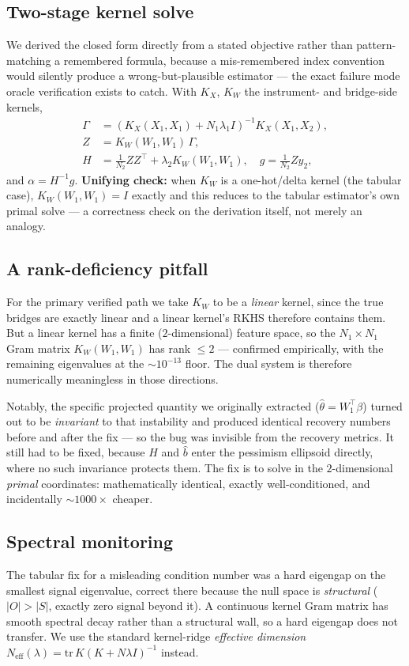 \subsection{Two-stage kernel solve}
We derived the closed form directly from a stated objective rather than
pattern-matching a remembered formula, because a mis-remembered index convention
would silently produce a wrong-but-plausible estimator --- the exact failure mode
oracle verification exists to catch. With $K_X$, $K_W$ the instrument- and
bridge-side kernels,
\begin{align}
\Gamma &= \left(K_X(X_1,X_1) + N_1\lambda_1 I\right)^{-1} K_X(X_1,X_2), \\
Z &= K_W(W_1,W_1)\,\Gamma, \\
H &= \tfrac{1}{N_2} Z Z^\top + \lambda_2 K_W(W_1,W_1), \quad
g = \tfrac{1}{N_2} Z y_2,
\end{align}
and $\alpha = H^{-1} g$. \textbf{Unifying check:} when $K_W$ is a one-hot/delta
kernel (the tabular case), $K_W(W_1,W_1) = I$ exactly and this reduces to the
tabular estimator's own primal solve --- a correctness check on the derivation
itself, not merely an analogy.

\subsection{A rank-deficiency pitfall}
For the primary verified path we take $K_W$ to be a \emph{linear} kernel, since
the true bridges are exactly linear and a linear kernel's RKHS therefore contains
them. But a linear kernel has a finite ($2$-dimensional) feature space, so the
$N_1 \times N_1$ Gram matrix $K_W(W_1,W_1)$ has rank $\le 2$ --- confirmed
empirically, with the remaining eigenvalues at the $\sim\!10^{-13}$ floor. The
dual system is therefore numerically meaningless in those directions.

Notably, the specific projected quantity we originally extracted
($\hat\theta = W_1^\top \beta$) turned out to be \emph{invariant} to that
instability and produced identical recovery numbers before and after the fix ---
so the bug was invisible from the recovery metrics. It still had to be fixed,
because $H$ and $\hat b$ enter the pessimism ellipsoid directly, where no such
invariance protects them. The fix is to solve in the $2$-dimensional
\emph{primal} coordinates: mathematically identical, exactly well-conditioned,
and incidentally $\sim\!1000\times$ cheaper.

\subsection{Spectral monitoring}
The tabular fix for a misleading condition number was a hard eigengap on the
smallest signal eigenvalue, correct there because the null space is
\emph{structural} ($|O| > |S|$, exactly zero signal beyond it). A continuous
kernel Gram matrix has smooth spectral decay rather than a structural wall, so a
hard eigengap does not transfer. We use the standard kernel-ridge
\emph{effective dimension} $N_{\mathrm{eff}}(\lambda) = \mathrm{tr}\,K(K + N\lambda I)^{-1}$
\citep{caponnetto2007} instead.

